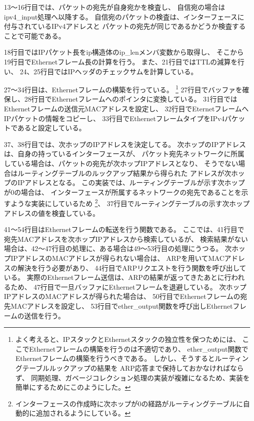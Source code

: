 13〜16行目では、パケットの宛先が自身宛かを検査し、
自信宛の場合はipv4\_input処理へ以降する。
自信宛のパケットの検査は、インターフェースに付与されているIPv4アドレスと
パケットの宛先が同じであるかどうか検査することで可能である。

18行目ではIPパケット長をip構造体のip\_lenメンバ変数から取得し、
そこから19行目でEthernetフレーム長の計算を行う。
また、21行目ではTTLの減算を行い、
24、25行目ではIPヘッダのチェックサムを計算している。

27〜34行目は、Ethernetフレームの構築を行っている。
\footnote{よく考えると、IPスタックとEthernetスタックの独立性を保つためには、
ここでEthernetフレームの構築を行うのは不適切であり、
ether\_output関数でEthernetフレームの構築を行うべきである。
しかし、そうするとルーティングテーブルルックアップの結果を
ARP応答まで保持しておかなければならず、
同期処理、ガベージコレクション処理の実装が複雑になるため、実装を
簡単にするためにこのようにした。}
27行目でバッファを確保し、28行目でEthernetフレームへのポインタに変換している。
31行目ではEthernetフレームの送信元MACアドレスを設定し、
32行目でEternetフレームへIPパケットの情報をコピーし、
33行目でEthernetフレームタイプをIPv4パケットであると設定している。

37、38行目では、次ホップのIPアドレスを決定してる。
次ホップのIPアドレスは、自身の持っているインターフェースが、
パケット宛先ネットワークに所属している場合は、パケットの宛先が次ホップIPアドレスとなり、
そうでない場合はルーティングテーブルのルックアップ結果から得られた
アドレスが次ホップのIPアドレスとなる。
この実装では、ルーティングテーブルが示す次ホップが0の場合は、
インターフェースが所属するネットワークの宛先であることを示すような実装にしているため
\footnote{インターフェースの作成時に次ホップが0の経路がルーティングテーブルに自動的に追加されるようにしている。}、
37行目でルーティングテーブルの示す次ホップアドレスの値を検査している。

41〜54行目はEthernetフレームの転送を行う関数である。
ここでは、41行目で宛先MACアドレスを次ホップIPアドレスから検索しているが、
検索結果がない場合は、42〜47行目の処理に、ある場合は49〜53行目の処理にうつる。
次ホップIPアドレスのMACアドレスが得られない場合は、
ARPを用いてMACアドレスの解決を行う必要があり、
44行目でARPリクエストを行う関数を呼び出している。
実際のEthernetフレーム送信は、ARPの結果が返ってきたあとに行われるため、
47行目で一旦バッファにEthernetフレームを退避している。
次ホップIPアドレスのMACアドレスが得られた場合は、
50行目でEthernetフレームの宛先MACアドレスを設定し、
53行目でether\_output関数を呼び出しEthernetフレームの送信を行う。

